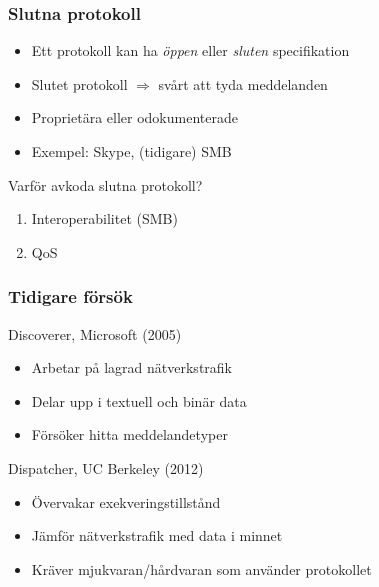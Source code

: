 \documentclass[xetex]{beamer}
\begin{document}
    \begin{frame}
        \frametitle{Slutna protokoll}
        \begin{itemize}
            \item Ett protokoll kan ha \emph{öppen} eller \emph{sluten}
                specifikation
            \item Slutet protokoll $\Rightarrow$ svårt att tyda meddelanden
            \item Proprietära eller odokumenterade
            \item Exempel: Skype, (tidigare) SMB
        \end{itemize}
        \vskip20pt
        Varför avkoda slutna protokoll?
        \begin{enumerate}
            \item Interoperabilitet (SMB)
            \item QoS
        \end{enumerate}
    \end{frame}
    \begin{frame}
        \frametitle{Tidigare försök}
        Discoverer, Microsoft (2005)
        \begin{itemize}
            \item Arbetar på lagrad nätverkstrafik
            \item Delar upp i textuell och binär data
            \item Försöker hitta meddelandetyper
        \end{itemize}
        \vskip20pt
        Dispatcher, UC Berkeley (2012)
        \begin{itemize}
            \item Övervakar exekveringstillstånd
            \item Jämför nätverkstrafik med data i minnet
            \item Kräver mjukvaran/hårdvaran som använder protokollet
        \end{itemize}
    \end{frame}
\end{document}

